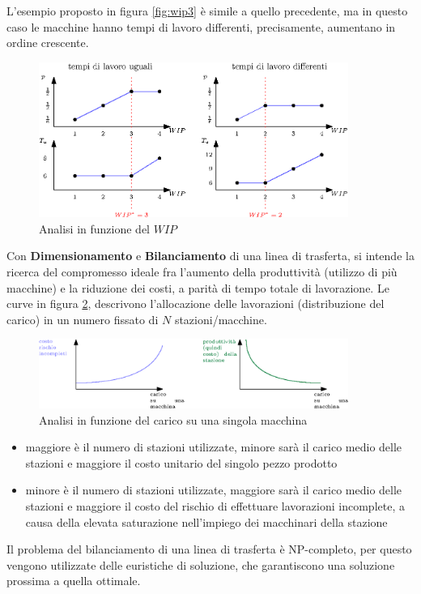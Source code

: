 \documentclass[10pt, letterpaper]{report}
\begin{document}
L'esempio proposto in figura \ref{fig:wip3} è simile a quello precedente, ma in questo caso le macchine hanno tempi 
di lavoro differenti, precisamente, aumentano in ordine crescente. 
\begin{center}
    \begin{figure}[h!]
        \centering
        \includegraphics[width=0.9\textwidth ]{images/analisiWIP.eps}
        \caption{Analisi in funzione del $WIP$}
        \label{fig:wipAnalysis}
    \end{figure}
\end{center}
Con \textbf{Dimensionamento} e \textbf{Bilanciamento} di una linea di trasferta, si intende la ricerca del 
compromesso ideale fra l'aumento della produttività (utilizzo di più macchine) e la riduzione dei costi, 
a parità di tempo totale di lavorazione. Le curve in figura \ref{fig:carico}, descrivono l'allocazione delle 
lavorazioni (distribuzione del carico) in un numero fissato di $N$ stazioni/macchine.
\begin{figure}[h!]
    \centering
    \includegraphics[width=0.9\textwidth ]{images/carico.eps}
    \caption{Analisi in funzione del carico su una singola macchina}
    \label{fig:carico}
\end{figure}
\begin{itemize}
    \item maggiore è il numero di stazioni utilizzate, minore sarà il carico medio delle
    stazioni e maggiore il costo unitario del singolo pezzo prodotto
    \item minore è il numero di stazioni utilizzate, maggiore sarà il carico medio delle
    stazioni e maggiore il costo del rischio di effettuare lavorazioni incomplete, 
    a causa della elevata saturazione nell'impiego dei macchinari della stazione
\end{itemize}
Il problema del bilanciamento di una linea di trasferta è NP-completo, per questo vengono utilizzate 
delle euristiche di soluzione, che garantiscono una soluzione prossima a quella ottimale. \acc 
\end{document}
